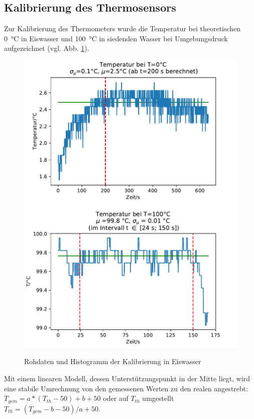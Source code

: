 \documentclass[]{article}
\begin{document}
	\subsection{Kalibrierung des Thermosensors}
	Zur Kalibrierung des Thermometers wurde die Temperatur bei theoretischen \SI{0}{\celsius} in Eiswasser und \SI{100}{\celsius} in siedenden Wasser bei Umgebungsdruck aufgezeichnet (vgl. Abb. \ref{K_Roh}).
	\begin{figure}
		\begin{center}
			\includegraphics[scale=0.45]{Images/Kalib_T_0.pdf}
			\includegraphics[scale=0.45]{Images/Kalib_T_100.pdf}
			\caption{Rohdaten und Histogramm der Kalibrierung in Eiswasser}
			\label{K_Roh}
		\end{center}
	\end{figure}
	Mit einem linearen Modell, dessen Unterstützungspunkt in der Mitte liegt, wird eine stabile Umrechnung von den gemessenen Werten zu den realen angestrebt: $T_{gem} = a*(T_{th}-50) + b + 50$ oder auf $T_{th}$ umgestellt $T_{th} = (T_{gem}-b-50)/a + 50$. \\
	
\end{document}
